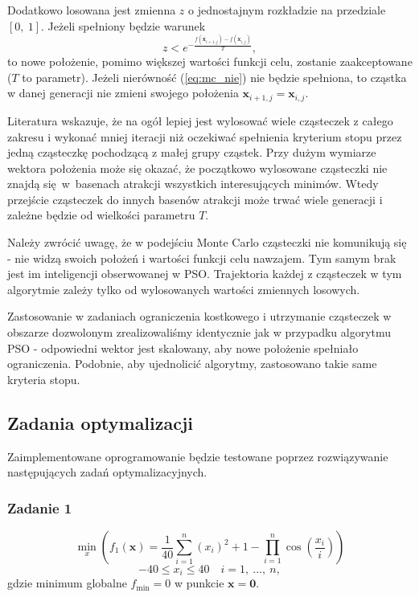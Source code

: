 \documentclass[11pt, a4paper, oneside]{article}
\newcommand{\vect}[1]{\bm{\mathbf{#1}}}
\begin{document}
Dodatkowo losowana jest zmienna $z$ o jednostajnym rozkładzie na przedziale $\left[0, \ 1 \right]$. Jeżeli spełniony będzie warunek
\begin{equation} \label{eq:mc_nie}
z < e^{-\frac{f\left(\vect{\overline{x}}_{i + 1, j}\right) - f\left(\vect{x}_{i, j}\right)}{T}},
\end{equation}
to nowe położenie, pomimo większej wartości funkcji celu, zostanie zaakceptowane ($T$ to parametr). Jeżeli nierówność (\ref{eq:mc_nie}) nie będzie spełniona, to cząstka w danej generacji nie zmieni swojego położenia $\vect{x}_{i + 1, j} = \vect{x}_{i, j}$. 

Literatura wskazuje, że na ogół lepiej jest wylosować wiele cząsteczek z całego zakresu i wykonać mniej iteracji niż oczekiwać spełnienia kryterium stopu przez jedną cząsteczkę pochodzącą z małej grupy cząstek. Przy dużym wymiarze wektora położenia może się okazać, że początkowo wylosowane cząsteczki nie znajdą się~w~basenach atrakcji wszystkich interesujących minimów. Wtedy przejście cząsteczek do innych basenów atrakcji może trwać wiele generacji i zależne będzie od wielkości parametru $T$.

Należy zwrócić uwagę, że w podejściu Monte Carlo cząsteczki nie komunikują się - nie widzą swoich położeń i wartości funkcji celu nawzajem. Tym samym brak jest im inteligencji obserwowanej w PSO. Trajektoria każdej z cząsteczek w tym algorytmie zależy tylko od wylosowanych wartości zmiennych losowych.

Zastosowanie w zadaniach ograniczenia kostkowego i utrzymanie cząsteczek w obszarze dozwolonym zrealizowaliśmy identycznie jak w przypadku algorytmu PSO - odpowiedni wektor jest skalowany, aby nowe położenie spełniało ograniczenia. Podobnie, aby ujednolicić algorytmy, zastosowano takie same kryteria stopu.

\subsection{Zadania optymalizacji}
Zaimplementowane oprogramowanie będzie testowane poprzez rozwiązywanie następujących zadań optymalizacyjnych.
\subsubsection{Zadanie 1}
\begin{equation}
\min_{x} \left(f_{1}\left(\vect{x}\right) = \frac{1}{40} \sum_{i=1}^{n}\left(x_{i}\right)^{2} + 1 - \prod_{i =1}^{n} \cos\left(\frac{x_{i}}{i}\right)\right)
\end{equation}
\begin{equation}
-40 \leq x_{i} \leq 40 \quad i = 1, \ ..., \ n,
\end{equation}
gdzie minimum globalne $f_{\mathrm{min}} = 0$ w punkcie $\vect{x} = \vect{0}$.
\end{document}
